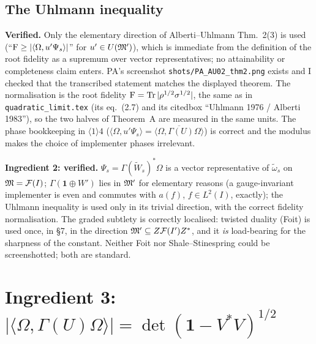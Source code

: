 \documentclass[11pt]{article}
\newcommand{\Wt}{\widetilde W}
\providecommand{\Om}{\Omega}\providecommand{\Gm}{\Gamma}\providecommand{\Qt}{\widetilde Q}
\providecommand{\ip}[2]{\langle #1,#2\rangle}\providecommand{\one}{\mathbf 1}
\begin{document}
\subsection{The Uhlmann inequality}
\textbf{Verified.}  Only the elementary direction of Alberti--Uhlmann Thm.~2(3) is used
(``$\Fid\ge|\ip{\Om}{u'\Psi_s}|$'' for $u'\in U(\mathfrak M')$), which is immediate from the definition of
the root fidelity as a supremum over vector representatives; no attainability or completeness claim
enters.  PA's screenshot \texttt{shots/PA\_AU02\_thm2.png} exists and I checked that the transcribed
statement matches the displayed theorem.  The normalisation is the root fidelity
$\operatorname{F}=\operatorname{Tr}|\rho^{1/2}\sigma^{1/2}|$, the same as in \texttt{quadratic\_limit.tex} (its
eq.~(2.7) and its citedbox ``Uhlmann 1976 / Alberti 1983''), so the two halves of Theorem~A are
measured in the same units.  The phase bookkeeping in $\langle1\rangle4$
($\ip{\Om}{u'\Psi_s}=\overline{\ip{\Om}{\Gm(U)\Om}}$) is correct and the modulus makes the choice of
implementer phases irrelevant.

\begin{verdictok}
\textbf{Ingredient 2: verified.}  $\Psi_s=\Gm(\Wt_s)^*\Om$ is a vector representative of
$\widetilde\omega_s$ on $\mathfrak M=\mathcal F(I)$; $\Gm(\one\oplus W')$ lies in $\mathfrak M'$ for elementary reasons
(a gauge-invariant implementer is even and commutes with $a(f)$, $f\in L^2(I)$, exactly); the
Uhlmann inequality is used only in its trivial direction, with the correct fidelity normalisation.
The graded subtlety is correctly localised: twisted duality (Foit) is used once, in \S7, in the
direction $\mathfrak M'\subseteq Z\mathcal F(I')Z^*$, and it \emph{is} load-bearing for the sharpness of the
constant.  Neither Foit nor Shale--Stinespring could be screenshotted; both are standard.
\end{verdictok}

\section{Ingredient 3: $|\ip\Om{\Gm(U)\Om}|=\det(\one-V^*V)^{1/2}$}\label{sec:i3}
\end{document}
